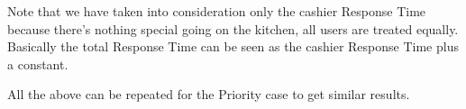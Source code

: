 
 Note that we have taken into consideration only the cashier Response Time because there's nothing special going on the kitchen, all users are treated equally. Basically the total Response Time can be seen as the cashier Response Time plus a constant. %


All the above can be repeated for the Priority case to get similar results.



